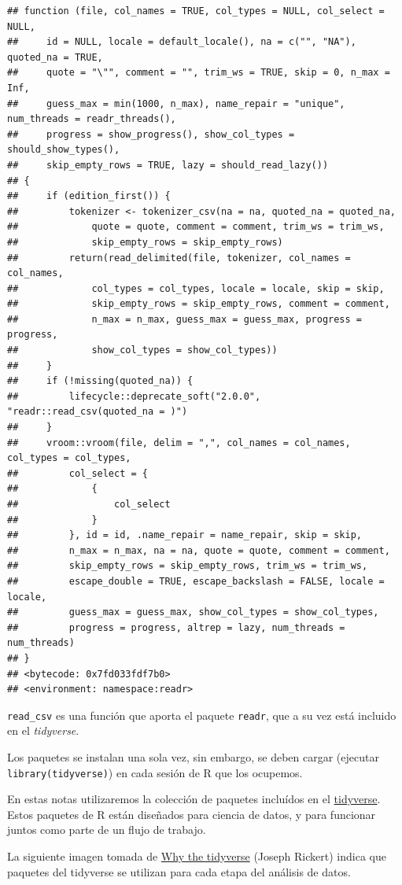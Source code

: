 \documentclass[
]{book}
\begin{document}
\begin{verbatim}
## function (file, col_names = TRUE, col_types = NULL, col_select = NULL, 
##     id = NULL, locale = default_locale(), na = c("", "NA"), quoted_na = TRUE, 
##     quote = "\"", comment = "", trim_ws = TRUE, skip = 0, n_max = Inf, 
##     guess_max = min(1000, n_max), name_repair = "unique", num_threads = readr_threads(), 
##     progress = show_progress(), show_col_types = should_show_types(), 
##     skip_empty_rows = TRUE, lazy = should_read_lazy()) 
## {
##     if (edition_first()) {
##         tokenizer <- tokenizer_csv(na = na, quoted_na = quoted_na, 
##             quote = quote, comment = comment, trim_ws = trim_ws, 
##             skip_empty_rows = skip_empty_rows)
##         return(read_delimited(file, tokenizer, col_names = col_names, 
##             col_types = col_types, locale = locale, skip = skip, 
##             skip_empty_rows = skip_empty_rows, comment = comment, 
##             n_max = n_max, guess_max = guess_max, progress = progress, 
##             show_col_types = show_col_types))
##     }
##     if (!missing(quoted_na)) {
##         lifecycle::deprecate_soft("2.0.0", "readr::read_csv(quoted_na = )")
##     }
##     vroom::vroom(file, delim = ",", col_names = col_names, col_types = col_types, 
##         col_select = {
##             {
##                 col_select
##             }
##         }, id = id, .name_repair = name_repair, skip = skip, 
##         n_max = n_max, na = na, quote = quote, comment = comment, 
##         skip_empty_rows = skip_empty_rows, trim_ws = trim_ws, 
##         escape_double = TRUE, escape_backslash = FALSE, locale = locale, 
##         guess_max = guess_max, show_col_types = show_col_types, 
##         progress = progress, altrep = lazy, num_threads = num_threads)
## }
## <bytecode: 0x7fd033fdf7b0>
## <environment: namespace:readr>
\end{verbatim}

\texttt{read\_csv} es una función que aporta el paquete \texttt{readr}, que a su vez está incluido en el
\emph{tidyverse}.

Los paquetes se instalan una sola vez, sin embargo, se deben cargar
(ejecutar \texttt{library(tidyverse)}) en cada sesión de R que los ocupemos.

En estas notas utilizaremos la colección de paquetes incluídos en el
\href{https://www.tidyverse.org/}{tidyverse}. Estos paquetes de R están
diseñados para ciencia de datos, y para funcionar juntos como parte de un flujo
de trabajo.

La siguiente imagen tomada de \href{https://rviews.rstudio.com/2017/06/08/what-is-the-tidyverse/}{Why the tidyverse} (Joseph
Rickert) indica que paquetes del tidyverse se utilizan para cada
etapa del análisis de datos.
\end{document}
